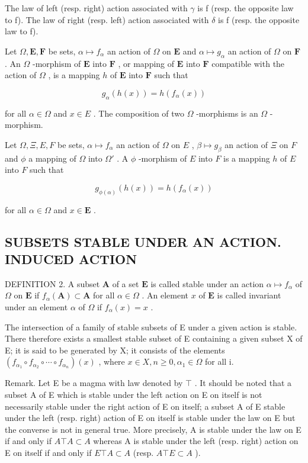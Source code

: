 The law of left (resp. right) action associated with \(\gamma\) is f (resp. the opposite law to f). The law of right (resp. left) action associated with \(\delta\) is f (resp. the opposite law to f).

Let \(\Omega, \mathbf{E}, \mathbf{F}\) be sets, \(\alpha \mapsto f_{\alpha}\) an action of \(\Omega\) on \(\mathbf{E}\) and \(\alpha \mapsto g_{\alpha}\) an action of \(\Omega\) on \(\mathbf{F}\) . An \(\Omega\) -morphism of \(\mathbf{E}\) into \(\mathbf{F}\) , or mapping of \(\mathbf{E}\) into \(\mathbf{F}\) compatible with the action of \(\Omega\) , is a mapping \(h\) of \(\mathbf{E}\) into \(\mathbf{F}\) such that

\[
g _ {\alpha} (h (x)) = h \left(f _ {\alpha} (x)\right)
\]

for all \(\alpha \in \Omega\) and \(x \in E\) . The composition of two \(\Omega\) -morphisms is an \(\Omega\) -morphism.

Let \(\Omega, \Xi, E, F\) be sets, \(\alpha \mapsto f_{\alpha}\) an action of \(\Omega\) on \(E\) , \(\beta \mapsto g_{\beta}\) an action of \(\Xi\) on \(F\) and \(\phi\) a mapping of \(\Omega\) into \(\Omega'\) . A \(\phi\) -morphism of \(E\) into \(F\) is a mapping \(h\) of \(E\) into \(F\) such that

\[
g _ {\phi (\alpha)} (h (x)) = h (f _ {\alpha} (x))
\]

for all \(\alpha \in \Omega\) and \(x \in \mathbf{E}\) .

\subsection{SUBSETS STABLE UNDER AN ACTION. INDUCED ACTION}

DEFINITION 2. A subset \(\mathbf{A}\) of a set \(\mathbf{E}\) is called stable under an action \(\alpha \mapsto f_{\alpha}\) of \(\Omega\) on \(\mathbf{E}\) if \(f_{\alpha}(\mathbf{A}) \subset \mathbf{A}\) for all \(\alpha \in \Omega\) . An element \(x\) of \(\mathbf{E}\) is called invariant under an element \(\alpha\) of \(\Omega\) if \(f_{\alpha}(x) = x\) .

The intersection of a family of stable subsets of E under a given action is stable. There therefore exists a smallest stable subset of E containing a given subset X of E; it is said to be generated by X; it consists of the elements \((f_{\alpha_{1}} \circ f_{\alpha_{2}} \circ \cdots \circ f_{\alpha_{n}})(x)\) , where \(x \in X, n \geqslant 0, \alpha_{1} \in \Omega\) for all i.

Remark. Let E be a magma with law denoted by \(\top\) . It should be noted that a subset A of E which is stable under the left action on E on itself is not necessarily stable under the right action of E on itself; a subset A of E stable under the left (resp. right) action of E on itself is stable under the law on E but the converse is not in general true. More precisely, A is stable under the law on E if and only if \(A \top A \subset A\) whereas A is stable under the left (resp. right) action on E on itself if and only if \(E \top A \subset A\) (resp. \(A \top E \subset A\) ).

